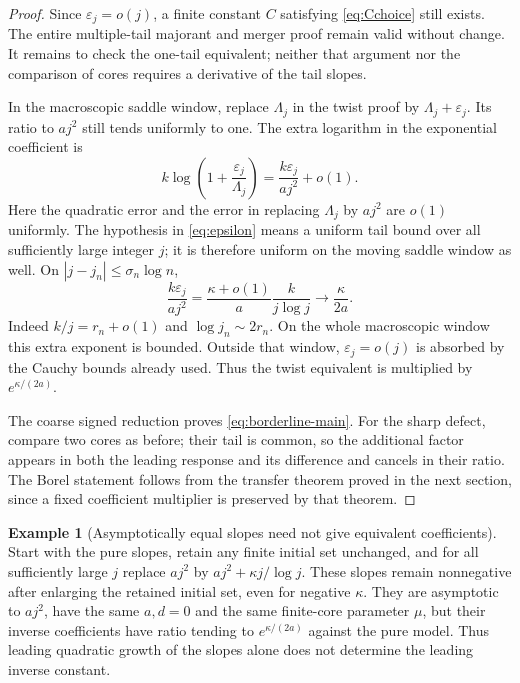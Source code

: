 \documentclass[11pt,a4paper]{article}
\numberwithin{equation}{section}
\theoremstyle{definition}
\newtheorem{example}[theorem]{Example}
\theoremstyle{remark}
\begin{document}
\begin{proof}
Since $\varepsilon_j=o(j)$, a finite constant $C$ satisfying
\eqref{eq:Cchoice} still exists. The entire multiple-tail majorant and
merger proof remain valid without change. It remains to check the
one-tail equivalent; neither that argument nor the comparison of cores
requires a derivative of the tail slopes.

In the macroscopic saddle window, replace $\Lambda_j$ in the twist proof
by $\Lambda_j+\varepsilon_j$. Its ratio to $a j^2$ still tends uniformly
to one. The extra logarithm in the exponential coefficient is
\begin{equation}
 k\log\left(1+\frac{\varepsilon_j}{\Lambda_j}\right)
 =\frac{k\varepsilon_j}{a j^2}+o(1).
 \label{eq:epsilon-local}
\end{equation}
Here the quadratic error and the error in replacing $\Lambda_j$ by
$a j^2$ are $o(1)$ uniformly. The hypothesis in \eqref{eq:epsilon}
means a uniform tail bound over all sufficiently large integer $j$;
it is therefore uniform on the moving saddle window as well.
On $|j-j_n|\le\sigma_n\log n$,
\[
 \frac{k\varepsilon_j}{a j^2}
 =\frac{\kappa+o(1)}a\frac{k}{j\log j}
 \longrightarrow\frac{\kappa}{2a}.
\]
Indeed $k/j=r_n+o(1)$ and $\log j_n\sim2r_n$.
On the whole macroscopic window this extra exponent is bounded.
Outside that window, $\varepsilon_j=o(j)$ is absorbed by the Cauchy
bounds already used. Thus the twist equivalent is multiplied by
$e^{\kappa/(2a)}$.

The coarse signed reduction proves \eqref{eq:borderline-main}.
For the sharp defect, compare two cores as before; their tail is common,
so the additional factor appears in both the leading response and its
difference and cancels in their ratio. The Borel statement follows from
the transfer theorem proved in the next section, since a fixed coefficient
multiplier is preserved by that theorem.
\end{proof}

\begin{example}[Asymptotically equal slopes need not give equivalent coefficients]
Start with the pure slopes, retain any finite initial set unchanged, and
for all sufficiently large $j$ replace $a j^2$ by
$a j^2+\kappa j/\log j$. These slopes remain nonnegative after enlarging
the retained initial set, even for negative $\kappa$. They are asymptotic
to $a j^2$, have the same $a,d=0$ and the same finite-core parameter
$\mu$, but their inverse coefficients have ratio tending to
$e^{\kappa/(2a)}$ against the pure model. Thus leading quadratic growth
of the slopes alone does not determine the leading inverse constant.
\end{example}
\end{document}
